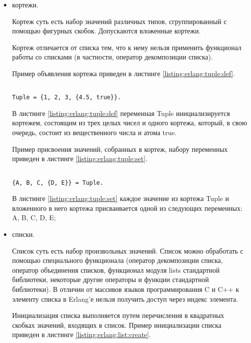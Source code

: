 \begin{itemize}
	\item кортежи.

		Кортеж суть есть набор значений различных типов, сгруппированный с помощью фигурных скобок. Допускаются вложенные кортежи.

		Кортеж отличается от списка тем, что к нему нельзя применить функционал работы со списками (в частности, оператор декомпозиции списка).

		Пример объявления кортежа приведен в листинге \ref{listing:erlang:tuple:def}.
		
\begin{lstlisting}

Tuple = {1, 2, 3, {4.5, true}}.

\end{lstlisting}
\mylistingend

		В листинге \ref{listing:erlang:tuple:def} переменная Tuple инициализируется кортежем, состоящим из трех целых чисел и одного кортежа, который, в свою очередь, состоит из вещественного числа и атома true.

		Пример присвоения значений, собранных в кортеж, набору переменных приведен в листинге \ref{listing:erlang:tuple:set}.

\begin{lstlisting}

{A, B, C, {D, E}} = Tuple.

\end{lstlisting}
\mylistingend

		В листинге \ref{listing:erlang:tuple:set} каждое значение из кортежа Tuple и вложенного в него кортежа присваивается одной из следующих переменных: A, B, C, D, E;

	\item списки.

		Список суть есть набор произвольных значений. Список можно обработать с помощью специального функционала (оператор декомпозиции списка, оператор объединения списков, функционал модуля lists стандартной библиотеки, некоторые другие операторы и функции стандартной библиотеки). В отличии от массивов языков программирования C и C++ к элементу списка в Erlang'е нельзя получить доступ через индекс элемента.

		Инициализация списка выполняется путем перечисления в квадратных скобках значений, входящих в список. Пример инициализации списка приведен в листинге \ref{listing:erlang:list:create}.


\end{itemize}
